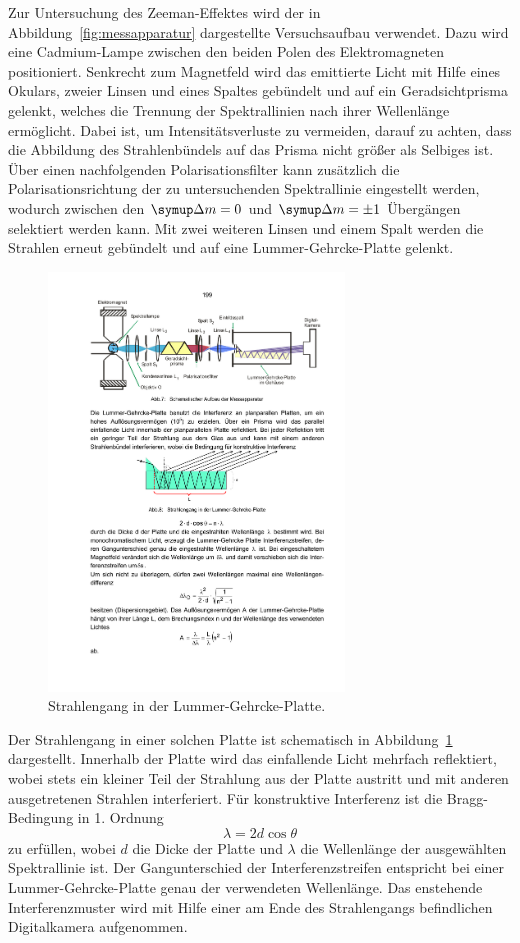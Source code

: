 Zur Untersuchung des Zeeman-Effektes wird der in Abbildung~\ref{fig:messapparatur} dargestellte
Versuchsaufbau verwendet. Dazu wird eine Cadmium-Lampe zwischen den beiden Polen des Elektromagneten positioniert.
Senkrecht zum Magnetfeld wird das emittierte Licht mit Hilfe eines Okulars, zweier Linsen und eines
Spaltes gebündelt und auf ein Geradsichtprisma gelenkt, welches die Trennung der Spektrallinien nach
ihrer Wellenlänge ermöglicht.
Dabei ist, um Intensitätsverluste zu vermeiden, darauf zu achten, dass die Abbildung des Strahlenbündels
auf das Prisma nicht größer als Selbiges ist.
Über einen nachfolgenden Polarisationsfilter kann zusätzlich die Polarisationsrichtung der zu untersuchenden
Spektrallinie eingestellt werden, wodurch zwischen den $\upD m=0$ und $\upD m=\pm1$ Übergängen selektiert werden kann.
Mit zwei weiteren Linsen und einem Spalt werden die Strahlen erneut gebündelt und auf eine Lummer-Gehrcke-Platte gelenkt.
\begin{figure}
    \centering
    \includegraphics[width=0.7\textwidth]{graphics/lummer-gehrcke.pdf}
    \caption{Strahlengang in der Lummer-Gehrcke-Platte.\cite{anleitung}}
    \label{fig:lummer-gehrcke}
\end{figure}
Der Strahlengang in einer solchen Platte ist schematisch in Abbildung~\ref{fig:lummer-gehrcke} dargestellt.
Innerhalb der Platte wird das einfallende Licht mehrfach reflektiert, wobei stets ein kleiner Teil der
Strahlung aus der Platte austritt und mit anderen ausgetretenen Strahlen interferiert.
Für konstruktive Interferenz ist die Bragg-Bedingung in 1. Ordnung
\begin{equation}
    \lambda=2d\cos\theta
\end{equation}
zu erfüllen, wobei $d$ die Dicke der Platte und $\lambda$ die Wellenlänge der ausgewählten Spektrallinie ist.
Der Gangunterschied der Interferenzstreifen entspricht bei einer Lummer-Gehrcke-Platte genau der verwendeten Wellenlänge.
Das enstehende Interferenzmuster wird mit Hilfe einer am Ende des Strahlengangs befindlichen Digitalkamera aufgenommen.

